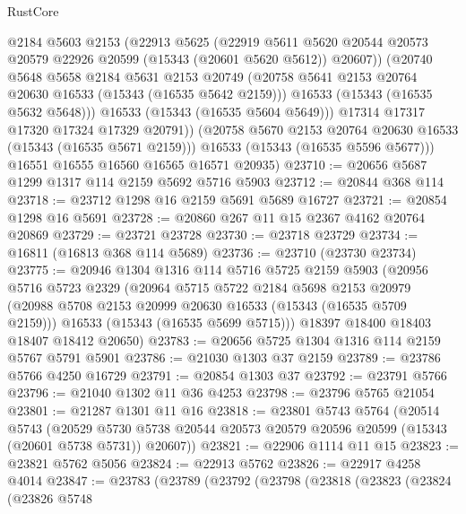 \begin{lexlean}{RustCore}
\begin{coremodule}
              @2184
              @5603
              @2153
              (@22913
                @5625
                (@22919
                  @5611
                  @5620
                  @20544
                  @20573
                  @20579
                  @22926
                  @20599
                  (@15343 (@20601 @5620 @5612))
                  @20607))
              (@20740
                @5648
                @5658
                @2184
                @5631
                @2153
                @20749
                (@20758 @5641 @2153 @20764 @20630 @16533 (@15343 (@16535 @5642 @2159)))
                @16533
                (@15343 (@16535 @5632 @5648)))
              @16533
              (@15343 (@16535 @5604 @5649)))
            @17314
            @17317
            @17320
            @17324
            @17329
            @20791))
        (@20758 @5670 @2153 @20764 @20630 @16533 (@15343 (@16535 @5671 @2159)))
        @16533
        (@15343 (@16535 @5596 @5677)))
      @16551
      @16555
      @16560
      @16565
      @16571
      @20935)
@23710 := @20656 @5687 @1299 @1317 @114 @2159 @5692 @5716 @5903
@23712 := @20844 @368 @114
@23718 := @23712 @1298 @16 @2159 @5691 @5689 @16727
@23721 := @20854 @1298 @16 @5691
@23728 := @20860 @267 @11 @15 @2367 @4162 @20764 @20869
@23729 := @23721 @23728
@23730 := @23718 @23729
@23734 := @16811 (@16813 @368 @114 @5689)
@23736 := @23710 (@23730 @23734)
@23775 := @20946
    @1304
    @1316
    @114
    @5716
    @5725
    @2159
    @5903
    (@20956
      @5716
      @5723
      @2329
      (@20964
        @5715
        @5722
        @2184
        @5698
        @2153
        @20979
        (@20988 @5708 @2153 @20999 @20630 @16533 (@15343 (@16535 @5709 @2159)))
        @16533
        (@15343 (@16535 @5699 @5715)))
      @18397
      @18400
      @18403
      @18407
      @18412
      @20650)
@23783 := @20656 @5725 @1304 @1316 @114 @2159 @5767 @5791 @5901
@23786 := @21030 @1303 @37 @2159
@23789 := @23786 @5766 @4250 @16729
@23791 := @20854 @1303 @37
@23792 := @23791 @5766
@23796 := @21040 @1302 @11 @36 @4253
@23798 := @23796 @5765 @21054
@23801 := @21287 @1301 @11 @16
@23818 := @23801
    @5743
    @5764
    (@20514
      @5743
      (@20529 @5730 @5738 @20544 @20573 @20579 @20596 @20599 (@15343 (@20601 @5738 @5731)) @20607))
@23821 := @22906 @1114 @11 @15
@23823 := @23821 @5762 @5056
@23824 := @22913 @5762
@23826 := @22917 @4258 @4014
@23847 := @23783
    (@23789
      (@23792
        (@23798
          (@23818
            (@23823
              (@23824
                (@23826
                  @5748

\end{coremodule}
\end{lexlean}
